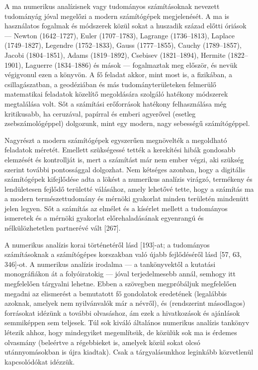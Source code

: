 \documentclass[
  magyar,
  11pt]{article}
\begin{document}
A ma numerikus analízisnek vagy tudományos számításoknak nevezett
tudományág jóval megelőzi a modern számítógépek megjelenését. A ma is
használatos fogalmak és módszerek közül sokat a huszadik század előtti
óriások --- Newton (1642--1727), Euler (1707--1783), Lagrange
(1736--1813), Laplace (1749--1827), Legendre (1752--1833), Gauss
(1777--1855), Cauchy (1789--1857), Jacobi (1804--1851), Adams
(1819--1892), Csebisev (1821--1894), Hermite (1822--1901), Laguerre
(1834--1886) és mások --- fogalmaztak meg először, és nevük végigvonul
ezen a könyvön. A fő feladat akkor, mint most is, a fizikában, a
csillagászatban, a geodéziában és más tudományterületeken felmerülő
matematikai feladatok közelítő megoldására szolgáló hatékony módszerek
megtalálása volt. Sőt a számítási erőforrások hatékony felhasználása még
kritikusabb, ha ceruzával, papírral és emberi agyerővel (esetleg
zsebszámológéppel) dolgozunk, mint egy modern, nagy sebességű
számítógéppel.

Nagyrészt a modern számítógépek egyszerűen megnövelték a megoldható
feladatok méretét. Emellett szükségessé tették a kerekítési hibák
gondosabb elemzését és kontrollját is, mert a számítást már nem ember
végzi, aki szükség szerint további pontossággal dolgozhat. Nem kétséges
azonban, hogy a digitális számítógépek kifejlődése adta a lökést a
numerikus analízis virágzó, termékeny és lendületesen fejlődő területté
válásához, amely lehetővé tette, hogy a számítás ma a modern
természettudomány és mérnöki gyakorlat minden területén mindenütt jelen
legyen. Sőt a számítás az elmélet és a kísérlet mellett a tudományos
ismeretek és a mérnöki gyakorlat előrehaladásának egyenrangú és
nélkülözhetetlen partnerévé vált {[}267{]}.

A numerikus analízis korai történetéről lásd {[}193{]}-at; a tudományos
számításoknak a számítógépes korszakban való újabb fejlődéséről lásd
{[}57, 63, 346{]}-ot. A numerikus analízis irodalma --- a tankönyvektől
a kutatási monográfiákon át a folyóiratokig --- jóval terjedelmesebb
annál, semhogy itt megfelelően tárgyalni lehetne. Ebben a szövegben
megpróbáljuk megfelelően megadni az elismerést a bemutatott fő
gondolatok eredetének (legalábbis azoknak, amelyek nem nyilvánvalók már
a névről), és (rendszerint másodlagos) forrásokat idézünk a további
olvasáshoz, ám ezek a hivatkozások és ajánlások semmiképpen sem
teljesek. Túl sok kiváló általános numerikus analízis tankönyv létezik
ahhoz, hogy mindegyiket megemlítsük, de közülük sok ma is érdemes
olvasmány (beleértve a régebbieket is, amelyek közül sokat olcsó
utánnyomásokban is újra kiadtak). Csak a tárgyalásunkhoz leginkább
közvetlenül kapcsolódókat idézzük.
\end{document}
